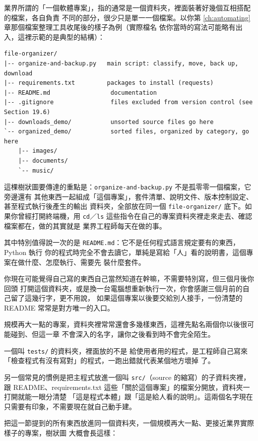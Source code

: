 業界所謂的「一個軟體專案」，指的通常是一個資料夾，裡面裝著好幾個互相搭配的檔案，各自負責
不同的部分，很少只是單一一個檔案。以你第 \ref{ch:automating} 章那個檔案整理工具收尾後的樣子為例（實際檔名
依你當時的寫法可能略有出入，這裡示範的是典型的結構）：

\begin{verbatim}
file-organizer/
|-- organize-and-backup.py   main script: classify, move, back up, download
|-- requirements.txt         packages to install (requests)
|-- README.md                 documentation
|-- .gitignore                files excluded from version control (see Section 19.6)
|-- downloads_demo/           unsorted source files go here
`-- organized_demo/           sorted files, organized by category, go here
    |-- images/
    |-- documents/
    `-- music/
\end{verbatim}

這棵樹狀圖要傳達的重點是：\texttt{organize-and-backup.py} 不是孤零零一個檔案，它旁邊還有
其他東西一起組成「這個專案」，套件清單、說明文件、版本控制設定、甚至程式執行後產生的輸出
資料夾，全部放在同一個 \texttt{file-organizer/} 底下。如果你曾經打開終端機，用
\texttt{cd}／\texttt{ls} 這些指令在自己的專案資料夾裡走來走去、確認檔案都在，做的其實就是
業界工程師每天在做的事。

其中特別值得說一次的是 \texttt{README.md}：它不是任何程式語言規定要有的東西，Python 執行
你的程式時完全不會去讀它，單純是寫給「人」看的說明書，這個專案在做什麼、怎麼執行、需要先
裝什麼套件。

你現在可能覺得自己寫的東西自己當然知道在幹嘛，不需要特別寫，但三個月後你回頭
打開這個資料夾，或是換一台電腦想重新執行一次，你會感謝三個月前的自己留了這幾行字，更不用說，
如果這個專案以後要交給別人接手，一份清楚的 README 常常是對方唯一的入口。

規模再大一點的專案，資料夾裡常常還會多幾樣東西，這裡先點名兩個你以後很可能碰到、但這一章
不會深入的名字，讓你之後看到時不會完全陌生。

一個叫 \texttt{tests/} 的資料夾，裡面放的不是
給使用者用的程式，是工程師自己寫來「檢查程式有沒有寫對」的程式，一跑出錯就代表某個地方壞掉
了。

另一個常見的慣例是把主程式放進一個叫 \texttt{src/}（source 的縮寫）的子資料夾裡，跟
README、requirements.txt 這些「關於這個專案」的檔案分開放，資料夾一打開就能一眼分清楚
「這是程式本體」跟「這是給人看的說明」。這兩個名字現在只需要有印象，不需要現在就自己動手建。

把這一節提到的所有東西放進同一個資料夾，一個規模再大一點、更接近業界實際樣子的專案，樹狀圖
大概會長這樣：

